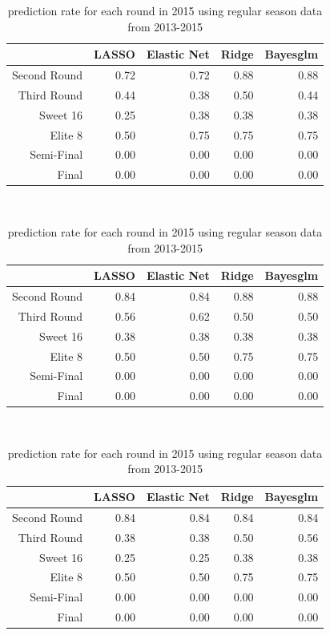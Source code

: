 \documentclass{article} %
\begin{document}
\begin{table}[H]
\centering
{\small
\begin{tabular}{rrrrr}
  \hline
 & LASSO & Elastic Net & Ridge & Bayesglm \\ 
  \hline
Second Round & 0.72 & 0.72 & 0.88 & 0.88 \\ 
  Third Round & 0.44 & 0.38 & 0.50 & 0.44 \\ 
  Sweet 16 & 0.25 & 0.38 & 0.38 & 0.38 \\ 
  Elite 8 & 0.50 & 0.75 & 0.75 & 0.75 \\ 
  Semi-Final & 0.00 & 0.00 & 0.00 & 0.00 \\ 
  Final & 0.00 & 0.00 & 0.00 & 0.00 \\ 
   \hline
\end{tabular}
}
\caption{prediction rate for each round in 2015}\

\centering
{\small
\begin{tabular}{rrrrr}
  \hline
 & LASSO & Elastic Net & Ridge & Bayesglm \\ 
  \hline
Second Round & 0.84 & 0.84 & 0.88 & 0.88 \\ 
  Third Round & 0.56 & 0.62 & 0.50 & 0.50 \\ 
  Sweet 16 & 0.38 & 0.38 & 0.38 & 0.38 \\ 
  Elite 8 & 0.50 & 0.50 & 0.75 & 0.75 \\ 
  Semi-Final & 0.00 & 0.00 & 0.00 & 0.00 \\ 
  Final & 0.00 & 0.00 & 0.00 & 0.00 \\ 
   \hline
\end{tabular}
}
\caption{prediction rate for each round in 2015 using regular season data from 2014-2015}\ 

\centering
{\small
\begin{tabular}{rrrrr}
  \hline
 & LASSO & Elastic Net & Ridge & Bayesglm \\ 
  \hline
Second Round & 0.84 & 0.84 & 0.84 & 0.84 \\ 
  Third Round & 0.38 & 0.38 & 0.50 & 0.56 \\ 
  Sweet 16 & 0.25 & 0.25 & 0.38 & 0.38 \\ 
  Elite 8 & 0.50 & 0.50 & 0.75 & 0.75 \\ 
  Semi-Final & 0.00 & 0.00 & 0.00 & 0.00 \\ 
  Final & 0.00 & 0.00 & 0.00 & 0.00 \\ 
   \hline
\end{tabular}
}
\caption{prediction rate for each round in 2015 using regular season data from 2013-2015} 
\end{table}
\end{document}
